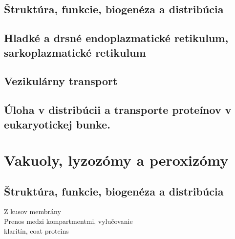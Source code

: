 \subsection{Štruktúra, funkcie, biogenéza a distribúcia}

\subsection{Hladké a drsné endoplazmatické retikulum, sarkoplazmatické retikulum}

\subsection{Vezikulárny transport}

\subsection{Úloha v distribúcii a transporte proteínov v eukaryotickej bunke.}

\section{Vakuoly, lyzozómy a peroxizómy}

\subsection{Štruktúra, funkcie, biogenéza a distribúcia}
Z kusov membrány\\
Prenos medzi kompartmentmi, vylučovanie\\
klaritín, coat proteins\\

